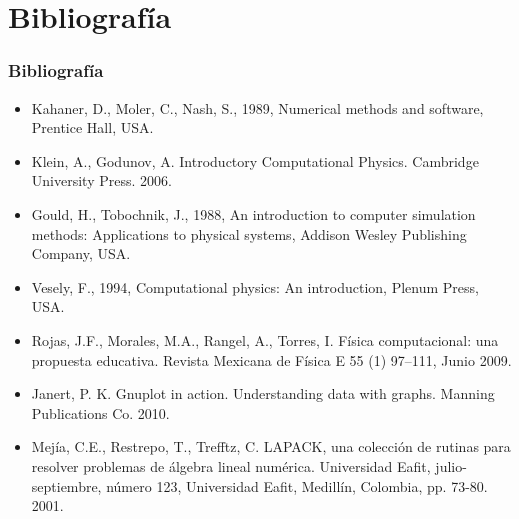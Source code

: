 \documentclass[12pt]{beamer}
\begin{document}
\section{Bibliograf\'{i}a}
\begin{frame}
\frametitle{Bibliograf\'{i}a}
\fontsize{10}{10}\selectfont
\begin{itemize}
\item Kahaner, D., Moler, C., Nash, S., 1989, Numerical methods and software, Prentice Hall, USA.
\item Klein, A., Godunov, A. Introductory Computational Physics. Cambridge University Press. 2006.
\item Gould, H., Tobochnik, J., 1988, An introduction to computer simulation methods: Applications to physical systems, Addison Wesley Publishing Company, USA.
\item Vesely, F., 1994, Computational physics: An introduction, Plenum Press, USA.
\item Rojas, J.F., Morales, M.A., Rangel, A., Torres, I. Física computacional: una propuesta educativa. Revista Mexicana de Física E 55 (1) 97–111, Junio 2009.
\item Janert, P. K. Gnuplot in action. Understanding data with graphs. Manning Publications Co. 2010.
\item Mejía, C.E., Restrepo, T., Trefftz, C. LAPACK, una colección de rutinas para resolver problemas de álgebra lineal numérica. Universidad Eafit, julio-septiembre, número 123, Universidad Eafit, Medillín, Colombia, pp. 73-80. 2001.
\end{itemize}
\end{frame}
\end{document}
